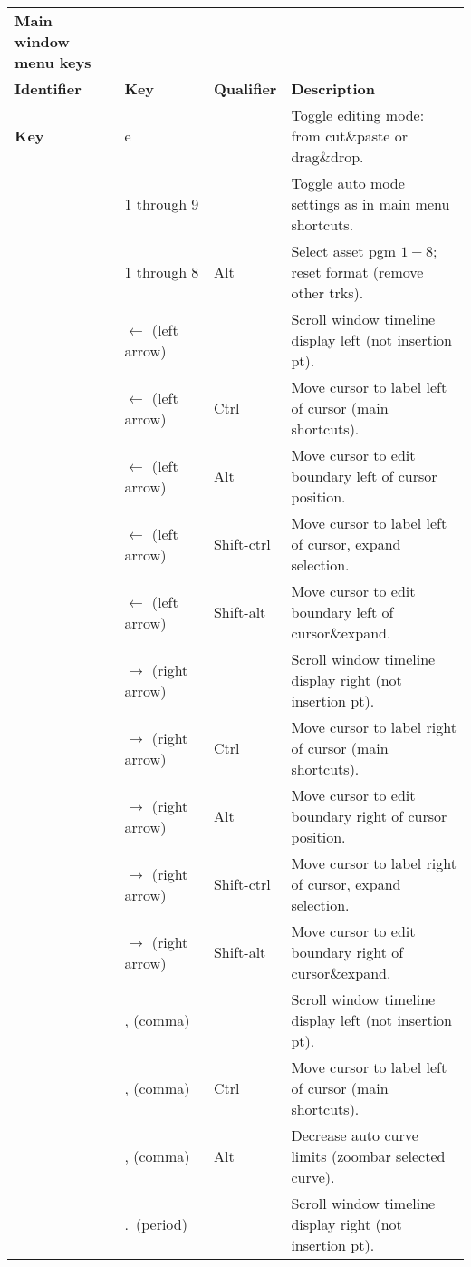 \begin{longtable}[h]{>{\bfseries}p{}p{}p{}p{}}
  \toprule
  \multicolumn{4}{c}%
  {\textcolor{CinRed}{\textbf{Main window menu keys}}} \\
  Identifier & \textbf{Key} & \textbf{Qualifier} & \textbf{Description}\\
  \midrule
  \endhead
  \textcolor{CinBlueText}{Key} & e & & Toggle editing mode: from cut\&paste or drag\&drop. \\
  & 1 through 9 &  & Toggle auto mode settings as in main menu shortcuts. \\
  & 1 through 8 & Alt & Select asset pgm $1-8$; reset format (remove other trks). \\
  & $\leftarrow$ (left arrow) &  & Scroll window timeline display left (not insertion pt). \\
  & $\leftarrow$ (left arrow) & Ctrl & Move cursor to label left of cursor (main shortcuts). \\
  & $\leftarrow$ (left arrow) & Alt & Move cursor to edit boundary left of cursor position. \\
  & $\leftarrow$ (left arrow) & Shift-ctrl & Move cursor to label left of cursor, expand selection. \\
  & $\leftarrow$ (left arrow) & Shift-alt & Move cursor to edit boundary left of cursor\&expand. \\
  & $\rightarrow$ (right arrow) &  & Scroll window timeline display right (not insertion pt). \\
  & $\rightarrow$ (right arrow) & Ctrl & Move cursor to label right of cursor (main shortcuts). \\
  & $\rightarrow$ (right arrow) & Alt & Move cursor to edit boundary right of cursor position. \\
  & $\rightarrow$ (right arrow) & Shift-ctrl & Move cursor to label right of cursor, expand selection. \\
  & $\rightarrow$ (right arrow) & Shift-alt & Move cursor to edit boundary right of cursor\&expand. \\
  & , (comma) &  & Scroll window timeline display left (not insertion pt). \\
  & , (comma) & Ctrl & Move cursor to label left of cursor (main shortcuts). \\
  & , (comma) & Alt & Decrease auto curve limits (zoombar selected curve). \\
  & .\ (period) &  & Scroll window timeline display right (not insertion pt). \\

\end{longtable}
